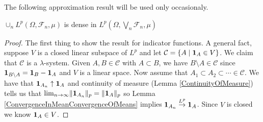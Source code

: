 The following approximation result will be used only occasionaly.
\begin{lem}\label{LpDensityUnionSubsigmaAlgebras}$\cup_n L^p(\Omega, \mathcal{F}_n, \mu)$ is dense in
  $L^p(\Omega, \bigvee_n \mathcal{F}_n, \mu)$
\end{lem}
\begin{proof}The first thing to show the result for indicator
  functions.  A general fact, suppose $V$ is a closed linear subspace of
  $L^p$ and let $\mathcal{C} = \lbrace A \mid \textbf{1}_{A} \in
   V\rbrace$.  We claim that $\mathcal{C}$ is a $\lambda$-system.
    Given $A, B \in \mathcal{C}$ with $A \subset B$, we have $B
    \setminus A \in \mathcal{C}$ since $\textbf{1}_{B \setminus A}
    = \textbf{1}_{B} - \textbf{1}_{A}$ and $V$ is a linear
    space.  Now assume that $A_1 \subset A_2 \subset \cdots \in
    \mathcal{C}$.  We have that $\textbf{1}_{A_n} \uparrow
    \textbf{1}_{A}$ and continuity of measure (Lemma
    \ref{ContinuityOfMeasure}) tells us that
    $\lim_{n \to \infty} \lVert \textbf{1}_{A_n} \rVert_p =
    \lVert \textbf{1}_{A} \rVert_p$ so Lemma
    \ref{ConvergenceInMeanConvergenceOfMeans} implies $\textbf{1}_{A_n}
    \overset{L^p}\to \textbf{1}_{A}$.  Since $V$ is closed we know
    $\textbf{1}_{A} \in V$.
\end{proof}

